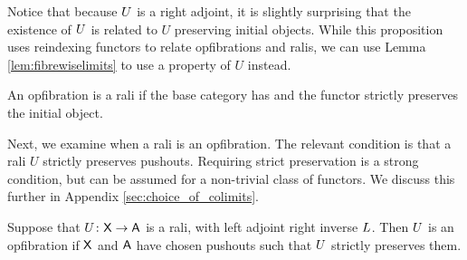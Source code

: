 \documentclass{amsart}
\begin{document}
Notice that because $U$ is a right adjoint, it is slightly surprising that the existence of $U$ is related to $U$ preserving initial objects. While this proposition uses reindexing functors to relate opfibrations and ralis, we can use Lemma \ref{lem:fibrewiselimits} to use a property of $U$ instead.

\begin{cor}
  An opfibration is a rali if the base category has and the functor strictly preserves the initial object.
\end{cor}

Next, we examine when a rali is an opfibration. The relevant condition is that a rali $U$ strictly preserves pushouts. Requiring strict preservation is a strong condition, but can be assumed for a non-trivial class of functors.  We discuss this further in Appendix \ref{sec:choice_of_colimits}.

\begin{prop}\label{prop:laritoopfib}
Suppose that $U\colon\mathsf{X}\to\mathsf{A}$ is a rali, with left adjoint right inverse $L$. Then $U$ is an opfibration if $\mathsf{X}$ and $\mathsf{A}$ have chosen pushouts such that $U$ strictly preserves them.
\end{prop}
\end{document}
